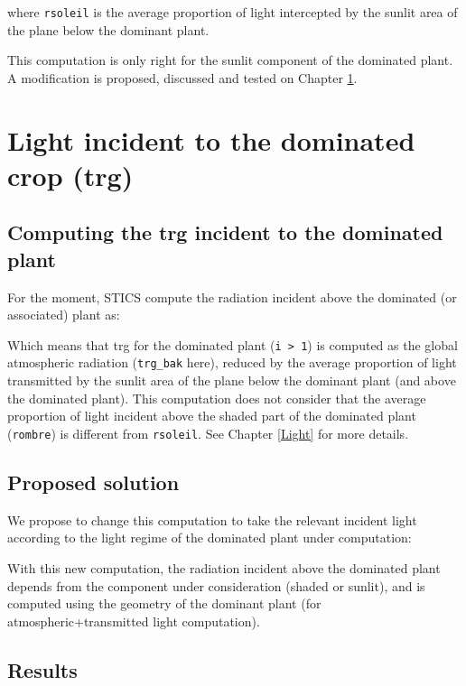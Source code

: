 \documentclass[]{book}
\theoremstyle{definition}
\theoremstyle{definition}
\theoremstyle{definition}
\theoremstyle{remark}
\begin{document}
where \texttt{rsoleil} is the average proportion of light intercepted by
the sunlit area of the plane below the dominant plant.

This computation is only right for the sunlit component of the dominated
plant. A modification is proposed, discussed and tested on Chapter
\ref{trg}.

\chapter{Light incident to the dominated crop (trg)}\label{trg}

\section{Computing the trg incident to the dominated
plant}\label{computing-the-trg-incident-to-the-dominated-plant}

For the moment, STICS compute the radiation incident above the dominated
(or associated) plant as:

Which means that trg for the dominated plant
(\texttt{i\ \textgreater{}\ 1}) is computed as the global atmospheric
radiation (\texttt{trg\_bak} here), reduced by the average proportion of
light transmitted by the sunlit area of the plane below the dominant
plant (and above the dominated plant). This computation does not
consider that the average proportion of light incident above the shaded
part of the dominated plant (\texttt{rombre}) is different from
\texttt{rsoleil}. See Chapter \ref{Light} for more details.

\section{Proposed solution}\label{proposed-solution}

We propose to change this computation to take the relevant incident
light according to the light regime of the dominated plant under
computation:

With this new computation, the radiation incident above the dominated
plant depends from the component under consideration (shaded or sunlit),
and is computed using the geometry of the dominant plant (for
atmospheric+transmitted light computation).

\section{Results}\label{results}
\end{document}
